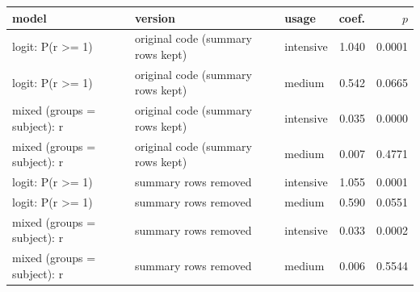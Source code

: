 \begin{tabular}{lllrr}
\toprule
model & version & usage & coef. & $p$ \\
\midrule
logit: P(r >= 1) & original code (summary rows kept) & intensive & 1.040 & 0.0001 \\
logit: P(r >= 1) & original code (summary rows kept) & medium & 0.542 & 0.0665 \\
mixed (groups = subject): r & original code (summary rows kept) & intensive & 0.035 & 0.0000 \\
mixed (groups = subject): r & original code (summary rows kept) & medium & 0.007 & 0.4771 \\
logit: P(r >= 1) & summary rows removed & intensive & 1.055 & 0.0001 \\
logit: P(r >= 1) & summary rows removed & medium & 0.590 & 0.0551 \\
mixed (groups = subject): r & summary rows removed & intensive & 0.033 & 0.0002 \\
mixed (groups = subject): r & summary rows removed & medium & 0.006 & 0.5544 \\
\bottomrule
\end{tabular}
